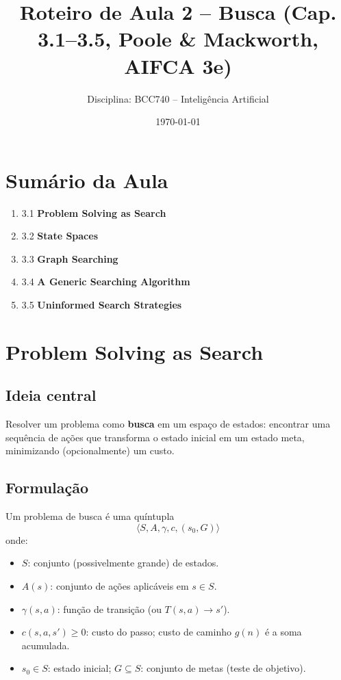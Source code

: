 \documentclass[9pt,a4paper]{extarticle}
\begin{document}
\title{Roteiro de Aula 2 -- Busca (Cap. 3.1--3.5, Poole \& Mackworth, AIFCA 3e)}
\author{Disciplina: BCC740 -- Inteligência Artificial}
\date{\today}
\maketitle

\section*{Sumário da Aula}
\begin{enumerate}
  \item 3.1 \textbf{Problem Solving as Search}
  \item 3.2 \textbf{State Spaces}
  \item 3.3 \textbf{Graph Searching}
  \item 3.4 \textbf{A Generic Searching Algorithm}
  \item 3.5 \textbf{Uninformed Search Strategies}
\end{enumerate}

\section{Problem Solving as Search}
\subsection*{Ideia central}
Resolver um problema como \textbf{busca} em um espaço de estados: encontrar uma sequência de ações que transforma o estado inicial em um estado meta, minimizando (opcionalmente) um custo.

\subsection*{Formulação}
Um problema de busca é uma quíntupla
\[
\langle S, A, \gamma, c, (s_0,G) \rangle
\]
onde:
\begin{itemize}
  \item $S$: conjunto (possivelmente grande) de estados.
  \item $A(s)$: conjunto de ações aplicáveis em $s \in S$.
  \item $\gamma(s,a)$: função de transição (ou $T(s,a)\to s'$).
  \item $c(s,a,s') \ge 0$: custo do passo; custo de caminho $g(n)$ é a soma acumulada.
  \item $s_0 \in S$: estado inicial; $G \subseteq S$: conjunto de metas (teste de objetivo).
\end{itemize}
\end{document}
